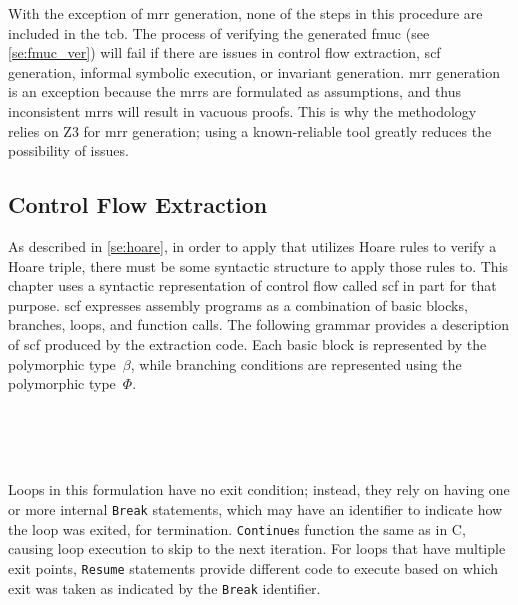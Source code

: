 With the exception of \ac{mrr} generation,
none of the steps in this procedure are included in the \ac{tcb}.
The process of verifying the generated \ac{fmuc} (see \cref{se:fmuc_ver})
will fail if there are issues in control flow extraction,
\ac{scf} generation, informal symbolic execution, or invariant generation.
\Ac{mrr} generation is an exception
because the \acp{mrr} are formulated as assumptions,
and thus inconsistent \acp{mrr} will result in vacuous proofs.
This is why the methodology relies on Z3 for \ac{mrr} generation;
using a known-reliable tool greatly reduces the possibility of issues.

\subsection{Control Flow Extraction}\label{sse:cfg_extract}
As described in \cref{se:hoare},
in order to apply  that utilizes Hoare rules to verify a Hoare triple,
there must be some syntactic structure to apply those rules to.
This chapter uses a syntactic representation of control flow called \ac{scf}
in part for that purpose.
\Ac{scf} expresses assembly programs as a combination of basic blocks,
branches, loops, and function calls.
The following grammar provides a description of \ac{scf}
produced by the extraction code.
Each basic block is represented by the polymorphic type~$\beta$,
while branching conditions are represented using the polymorphic type~$\Phi$.
\begin{bnf}
   \\
   \\
   \\
\end{bnf}
Loops in this formulation have no exit condition;%
instead, they rely on having one or more internal \texttt{Break} statements,%
which may have an identifier to indicate how the loop was exited, for termination.
\texttt{Continue}s function the same as in C,%
causing loop execution to skip to the next iteration.
For loops that have multiple exit points,
\texttt{Resume} statements provide different code to execute
based on which exit was taken as indicated by the \texttt{Break} identifier.


